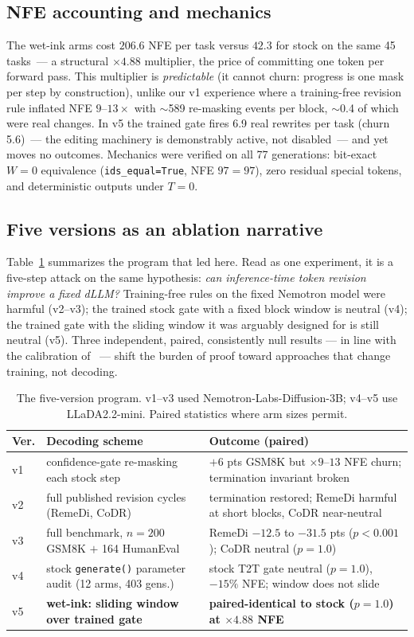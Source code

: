 \subsection{NFE accounting and mechanics}
The wet-ink arms cost $206.6$ NFE per task versus $42.3$ for stock on the same 45
tasks~--- a structural $\times 4.88$ multiplier, the price of committing one token
per forward pass. This multiplier is \emph{predictable} (it cannot churn: progress
is one mask per step by construction), unlike our v1 experience where a
training-free revision rule inflated NFE $9$--$13\times$ with
$\sim$589 re-masking events per block, $\sim$0.4 of which were real changes. In v5
the trained gate fires 6.9 real rewrites per task (churn 5.6)~--- the editing
machinery is demonstrably active, not disabled~--- and yet moves no outcomes.
Mechanics were verified on all 77 generations: bit-exact $W{=}0$ equivalence
(\texttt{ids\_equal=True}, NFE $97{=}97$), zero residual special tokens, and
deterministic outputs under $T{=}0$.

\subsection{Five versions as an ablation narrative}\label{sec:journey}
Table~\ref{tab:journey} summarizes the program that led here. Read as one
experiment, it is a five-step attack on the same hypothesis: \emph{can inference-time
token revision improve a fixed dLLM?} Training-free rules on the fixed Nemotron
model were harmful (v2--v3); the trained stock gate with a fixed block window is
neutral (v4); the trained gate with the sliding window it was arguably designed
for is still neutral (v5). Three independent, paired, consistently null results
--- in line with the calibration of \citet{remeval}~--- shift the burden of proof
toward approaches that change training, not decoding.

\begin{table}[t]
\centering\small
\caption{The five-version program. v1--v3 used
Nemotron-Labs-Diffusion-3B; v4--v5 use LLaDA2.2-mini. Paired statistics where
arm sizes permit.}\label{tab:journey}
\begin{tabularx}{\textwidth}{l l X}
\toprule
Ver. & Decoding scheme & Outcome (paired) \\
\midrule
v1 & confidence-gate re-masking each stock step & $+$6 pts GSM8K but
$\times 9$--$13$ NFE churn; termination invariant broken \\
v2 & full published revision cycles (RemeDi, CoDR) & termination restored;
RemeDi harmful at short blocks, CoDR near-neutral \\
v3 & full benchmark, $n{=}200$ GSM8K $+$ 164 HumanEval & RemeDi $-12.5$ to
$-31.5$ pts ($p{<}0.001$); CoDR neutral ($p{=}1.0$) \\
v4 & stock \texttt{generate()} parameter audit (12 arms, 403 gens.) & stock T2T
gate neutral ($p{=}1.0$), $-15\%$ NFE; window does not slide \\
v5 & \textbf{wet-ink: sliding window over trained gate} & \textbf{paired-identical
to stock ($p{=}1.0$) at $\times 4.88$ NFE} \\
\bottomrule
\end{tabularx}
\end{table}
